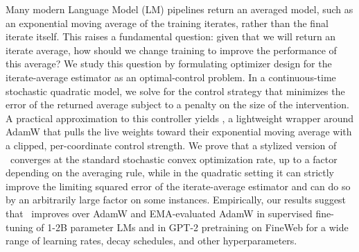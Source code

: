 Many modern Language Model (LM) pipelines return an averaged model, such as an exponential moving average of the training iterates, rather than the final iterate itself. This raises a fundamental question: given that we will return an iterate average, how should we change training to improve the performance of this average? We study this question by formulating optimizer design for the iterate-average estimator as an optimal-control problem. In a continuous-time stochastic quadratic model, we solve for the control strategy that minimizes the error of the returned average subject to a penalty on the size of the intervention. A practical approximation to this controller yields \pace, a lightweight wrapper around AdamW that pulls the live weights toward their exponential moving average with a clipped, per-coordinate control strength. We prove that a stylized version of \pace\ converges at the standard stochastic convex optimization rate, up to a factor depending on the averaging rule, while in the quadratic setting it can strictly improve the limiting squared error of the iterate-average estimator and can do so by an arbitrarily large factor on some instances. Empirically, our results suggest that \pace\ improves over AdamW and EMA-evaluated AdamW in supervised fine-tuning of 1-2B parameter LMs and in GPT-2 pretraining on FineWeb for a wide range of learning rates, decay schedules, and other hyperparameters.
